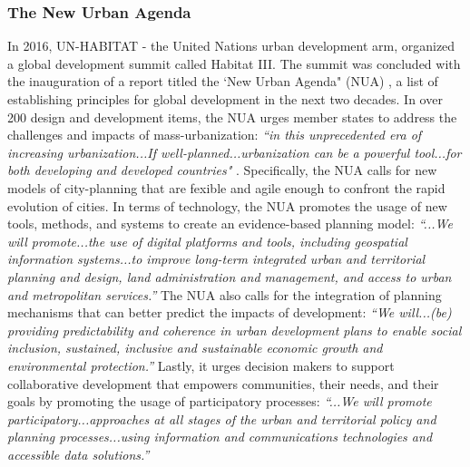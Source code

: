 {{        \subsubsection{The New Urban Agenda}
        {
            In 2016, UN-HABITAT - the United Nations urban development arm, organized a global development summit called Habitat III. The summit was concluded with the inauguration of a report titled the `New Urban Agenda" (NUA) \cite{habitat2016new}, a list of establishing principles for global development in the next two decades. In over 200 design and development items, the NUA urges member states to address the challenges and impacts of mass-urbanization: \textit{``in this unprecedented era of increasing urbanization...If well-planned...urbanization can be a powerful tool...for both developing and developed countries"} \cite{habitat2016new}. Specifically, the NUA calls for new models of city-planning that are fexible and agile enough to confront the rapid evolution of cities.
            \newline
            In terms of technology, the NUA promotes the usage of new tools, methods, and systems to create an evidence-based planning model: \textit{``...We will promote...the use of digital platforms and tools, including geospatial information systems...to improve long-term integrated urban and territorial planning and design, land administration and management, and access to urban and metropolitan services.''}
            The NUA also calls for the integration of planning mechanisms that can better predict the impacts of development: \textit{``We will...(be) providing predictability and coherence in urban development plans to enable social inclusion, sustained, inclusive and sustainable economic growth and environmental protection.''} Lastly,
            it urges decision makers to support collaborative development that empowers communities, their needs, and their goals by promoting the usage of participatory processes: \textit{``...We will promote participatory...approaches at all stages of the urban and territorial policy and planning processes...using information and communications technologies and accessible data solutions.''}
        }

}}
